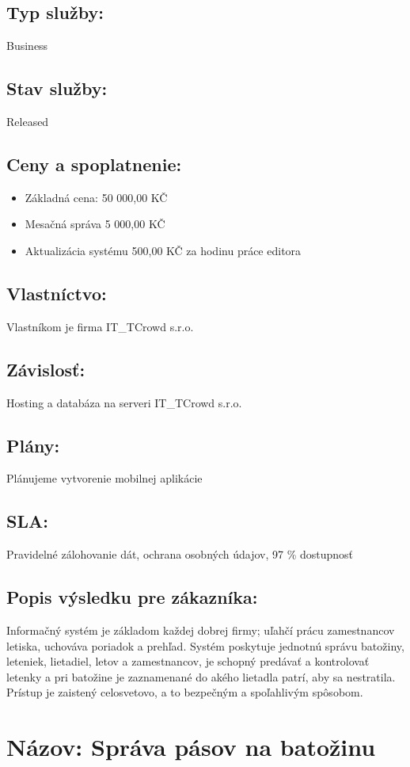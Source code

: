 \documentclass[a4paper, 11pt]{article}
\begin{document}
\subsection*{Typ služby:}
Business
\subsection*{Stav služby:}
Released
\subsection*{Ceny a spoplatnenie:}
\begin{itemize}
\item Základná cena: 50 000,00 KČ
\item Mesačná správa 5 000,00 KČ
\item Aktualizácia systému 500,00 KČ za hodinu práce editora
\end{itemize}
\subsection*{Vlastníctvo:}
Vlastníkom je firma IT\_TCrowd s.r.o.
\subsection*{Závislosť:}
Hosting a databáza na serveri IT\_TCrowd s.r.o.
\subsection*{Plány:}
Plánujeme vytvorenie mobilnej aplikácie
\subsection*{SLA:}
Pravidelné zálohovanie dát, ochrana osobných údajov, 97 \% dostupnosť
\subsection*{Popis výsledku pre zákazníka:}
Informačný systém je základom každej dobrej firmy; uľahčí prácu zamestnancov letiska, uchováva poriadok a prehľad. Systém poskytuje jednotnú správu batožiny, leteniek, lietadiel, letov a zamestnancov, je schopný predávať a kontrolovať letenky a pri batožine je zaznamenané do akého lietadla patrí, aby sa nestratila. Prístup je zaistený celosvetovo, a to bezpečným a spoľahlivým spôsobom.

\section*{Názov: Správa pásov na batožinu}
\end{document}
